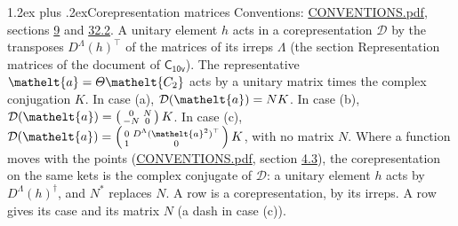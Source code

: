 \documentclass[10pt,a4paper]{article}
\makeatletter
\renewcommand\section{\@startsection{section}{1}{\z@}{-3ex plus -1ex minus -.2ex}%
  {1.2ex plus .2ex}{\normalfont\large\sffamily\bfseries\color{parttitle}}}
\numberwithin{equation}{section}
\newcommand{\eltfont}[1]{{\let\sigma\eltsigma\mathelt{#1}}}
\newcommand{\grp}[1]{\mathsf{#1}}
\newcommand{\elt}[1]{\eltfont{#1}}
\makeatother
\begin{document}
\section{Corepresentation matrices}\label{s:corep_matrices}
Conventions: \href{../../CONVENTIONS.pdf}{CONVENTIONS.pdf}, sections \href{../../../rotation/CONVENTIONS.pdf\#conv.9}{9} and \href{../../CONVENTIONS.pdf\#conv.32.2}{32.2}.
A unitary element $h$ acts in a corepresentation $\mathcal{D}$ by the transposes $D^{\Lambda}(h)^{\top}$ of the matrices of its irreps $\Lambda$ (the section Representation matrices of the document of \href{../../../rotation/data/pdf/C10v.pdf}{$\grp{C_{10v}}$}). The representative $\elt{a} = \varTheta\elt{C_{2}}$ acts by a unitary matrix times the complex conjugation $K$.
In case (a), $\mathcal{D}(\elt{a}) = NK$. In case (b), $\mathcal{D}(\elt{a}) = \left(\begin{smallmatrix} 0 & N \\ -N & 0 \end{smallmatrix}\right) K$. In case (c), $\mathcal{D}(\elt{a}) = \left(\begin{smallmatrix} 0 & D^{\Lambda}(\elt{a}^2)^{\top} \\ 1 & 0 \end{smallmatrix}\right) K$, with no matrix $N$.
Where a function moves with the points (\href{../../CONVENTIONS.pdf}{CONVENTIONS.pdf}, section \href{../../../rotation/CONVENTIONS.pdf\#conv.4.3}{4.3}), the corepresentation on the same kets is the complex conjugate of $\mathcal{D}$: a unitary element $h$ acts by $D^{\Lambda}(h)^{\dagger}$, and $N^{*}$ replaces $N$.
A row is a corepresentation, by its irreps. A row gives its case and its matrix $N$ (a dash in case (c)).
\end{document}
